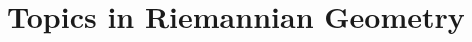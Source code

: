 \documentclass[../main]{subfiles}
\begin{document}
\chapter{Topics in Riemannian Geometry}\label{ch10}










\end{document}
